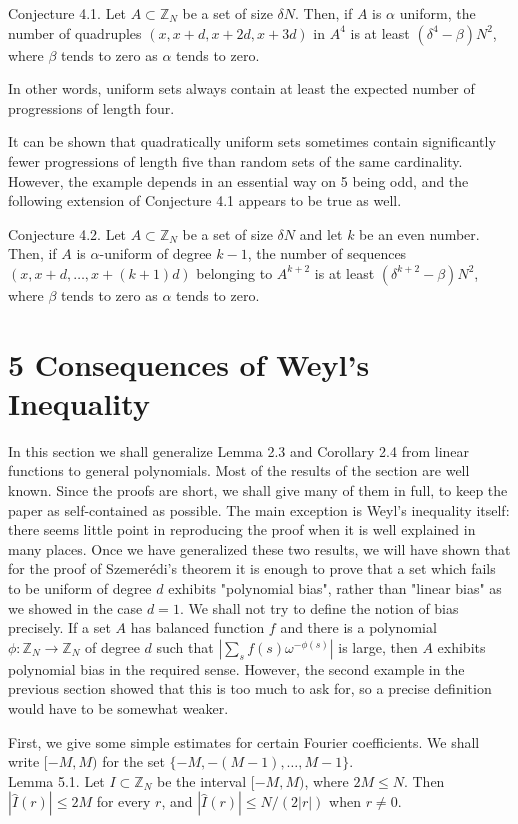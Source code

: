 \documentclass[10pt]{article}
\begin{document}
Conjecture 4.1. Let $A \subset \mathbb{Z}_{N}$ be a set of size $\delta N$. Then, if $A$ is $\alpha$ uniform, the number of quadruples $(x, x+d, x+2 d, x+3 d)$ in $A^{4}$ is at least $\left(\delta^{4}-\beta\right) N^{2}$, where $\beta$ tends to zero as $\alpha$ tends to zero.

In other words, uniform sets always contain at least the expected number of progressions of length four.

It can be shown that quadratically uniform sets sometimes contain significantly fewer progressions of length five than random sets of the same cardinality. However, the example depends in an essential way on 5 being odd, and the following extension of Conjecture 4.1 appears to be true as well.

Conjecture 4.2. Let $A \subset \mathbb{Z}_{N}$ be a set of size $\delta N$ and let $k$ be an even number. Then, if $A$ is $\alpha$-uniform of degree $k-1$, the number of sequences $(x, x+d, \ldots, x+(k+1) d)$ belonging to $A^{k+2}$ is at least $\left(\delta^{k+2}-\beta\right) N^{2}$, where $\beta$ tends to zero as $\alpha$ tends to zero.

\section*{5 Consequences of Weyl's Inequality}
In this section we shall generalize Lemma 2.3 and Corollary 2.4 from linear functions to general polynomials. Most of the results of the section are well known. Since the proofs are short, we shall give many of them in full, to keep the paper as self-contained as possible. The main exception is Weyl's inequality itself: there seems little point in reproducing the proof when it is well explained in many places. Once we have generalized these two results, we will have shown that for the proof of Szemerédi's theorem it is enough to prove that a set which fails to be uniform of degree $d$ exhibits "polynomial bias", rather than "linear bias" as we showed in the case $d=1$. We shall not try to define the notion of bias precisely. If a set $A$ has balanced function $f$ and there is a polynomial $\phi: \mathbb{Z}_{N} \rightarrow \mathbb{Z}_{N}$ of degree $d$ such that $\left|\sum_{s} f(s) \omega^{-\phi(s)}\right|$ is large, then $A$ exhibits polynomial bias in the required sense. However, the second example in the previous section showed that this is too much to ask for, so a precise definition would have to be somewhat weaker.

First, we give some simple estimates for certain Fourier coefficients. We shall write $[-M, M)$ for the set $\{-M,-(M-1), \ldots, M-1\}$.\\
Lemma 5.1. Let $I \subset \mathbb{Z}_{N}$ be the interval $[-M, M)$, where $2M\leqslant N$. Then $|\hat{I}(r)| \leqslant 2M$ for every $r$, and $|\hat{I}(r)| \leqslant N/(2|r|)$ when $r\ne0$.
\end{document}
